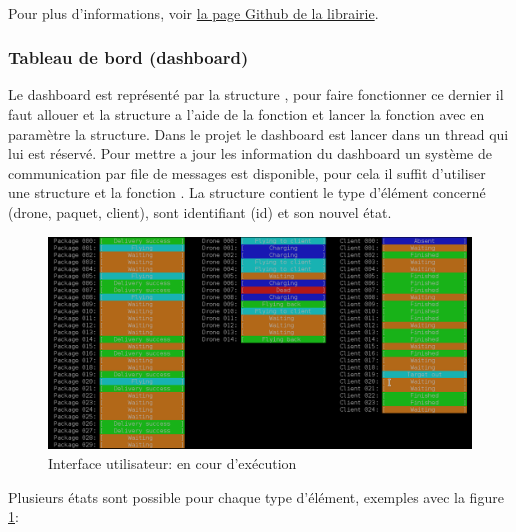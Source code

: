 \documentclass[article, backcover, french, nodocumentinfo]{upmethodology-document}
\begin{document}
				\paragraph*{}
					Pour plus d'informations, voir \href{https://github.com/pinam45/ConsoleControl}{la page Github de la librairie}.
			\subsubsection{Tableau de bord (dashboard)}
					Le dashboard est représenté par la structure , pour faire fonctionner ce dernier il faut allouer et la structure a l'aide de la fonction  et lancer la fonction  avec en paramètre la structure. Dans le projet le dashboard est lancer dans un thread qui lui est réservé.
					Pour mettre a jour les information du dashboard un système de communication par file de messages est disponible, pour cela il suffit d'utiliser une structure  et la fonction . La structure  contient le type d'élément concerné (drone, paquet, client), sont identifiant (id) et son nouvel état.
					\begin{figure}[H]
						\centering
						\includegraphics[width=\textwidth]{figures/UI1}
						\caption{Interface utilisateur: en cour d’exécution}
						\label{fig:UIrunning}
					\end{figure}
					Plusieurs états sont possible pour chaque type d'élément, exemples avec la figure \ref{fig:UIrunning}:
\end{document}
